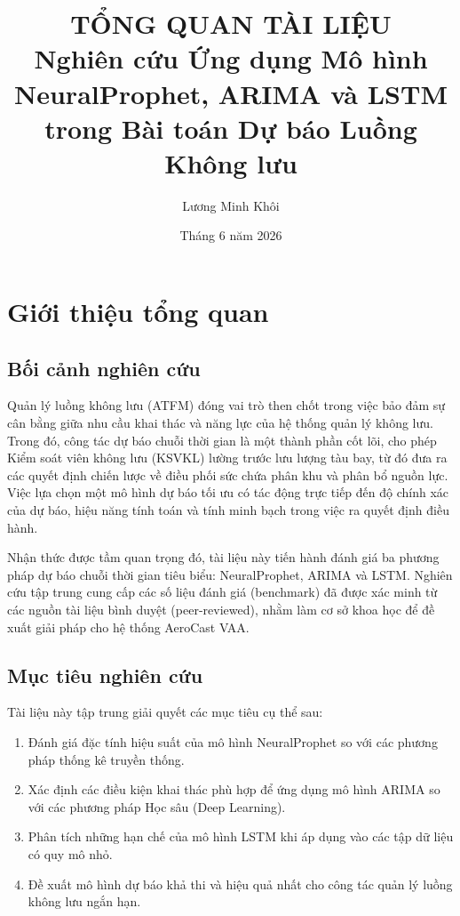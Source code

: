 \documentclass[12pt,a4paper]{article}
\title{\textbf{TỔNG QUAN TÀI LIỆU} \\ \large Nghiên cứu Ứng dụng Mô hình NeuralProphet, ARIMA và LSTM trong Bài toán Dự báo Luồng Không lưu}
\author{Lương Minh Khôi}
\date{Tháng 6 năm 2026}
\begin{document}
\maketitle


\section{Giới thiệu tổng quan}

\subsection{Bối cảnh nghiên cứu}

Quản lý luồng không lưu (ATFM) đóng vai trò then chốt trong việc bảo đảm sự cân bằng giữa nhu cầu khai thác và năng lực của hệ thống quản lý không lưu. Trong đó, công tác dự báo chuỗi thời gian là một thành phần cốt lõi, cho phép Kiểm soát viên không lưu (KSVKL) lường trước lưu lượng tàu bay, từ đó đưa ra các quyết định chiến lược về điều phối sức chứa phân khu và phân bổ nguồn lực. Việc lựa chọn một mô hình dự báo tối ưu có tác động trực tiếp đến độ chính xác của dự báo, hiệu năng tính toán và tính minh bạch trong việc ra quyết định điều hành.

Nhận thức được tầm quan trọng đó, tài liệu này tiến hành đánh giá ba phương pháp dự báo chuỗi thời gian tiêu biểu: NeuralProphet, ARIMA và LSTM. Nghiên cứu tập trung cung cấp các số liệu đánh giá (benchmark) đã được xác minh từ các nguồn tài liệu bình duyệt (peer-reviewed), nhằm làm cơ sở khoa học để đề xuất giải pháp cho hệ thống AeroCast VAA.

\subsection{Mục tiêu nghiên cứu}

Tài liệu này tập trung giải quyết các mục tiêu cụ thể sau:

\begin{enumerate}
    \item Đánh giá đặc tính hiệu suất của mô hình NeuralProphet so với các phương pháp thống kê truyền thống.
    \item Xác định các điều kiện khai thác phù hợp để ứng dụng mô hình ARIMA so với các phương pháp Học sâu (Deep Learning).
    \item Phân tích những hạn chế của mô hình LSTM khi áp dụng vào các tập dữ liệu có quy mô nhỏ.
    \item Đề xuất mô hình dự báo khả thi và hiệu quả nhất cho công tác quản lý luồng không lưu ngắn hạn.
\end{enumerate}
\end{document}
